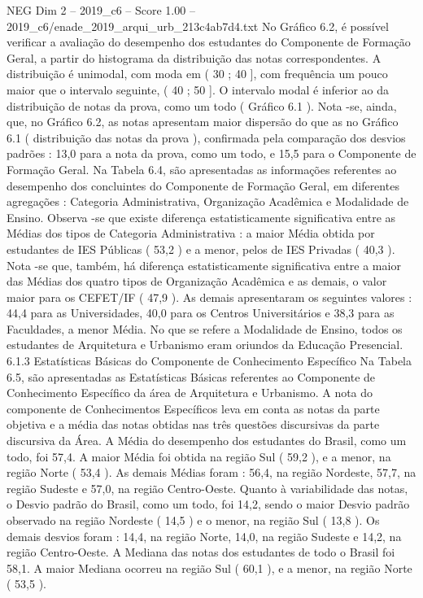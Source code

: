 \begin{textsample}{NEG Dim 2 – 2019\_c6 – Score 1.00 – 2019\_c6/enade\_2019\_arqui\_urb\_213c4ab7d4.txt}
No Gráfico 6.2, é possível verificar a avaliação do desempenho dos estudantes do Componente de Formação Geral, a partir do histograma da distribuição das notas correspondentes.
A distribuição é unimodal, com moda em ( 30 ; 40 ], com frequência um pouco maior que o intervalo seguinte, ( 40 ; 50 ].
O intervalo modal é inferior ao da distribuição de notas da prova, como um todo ( Gráfico 6.1 ).
Nota -se, ainda, que, no Gráfico 6.2, as notas apresentam maior dispersão do que as no Gráfico 6.1 ( distribuição das notas da prova ), confirmada pela comparação dos desvios padrões : 13,0 para a nota da prova, como um todo, e 15,5 para o Componente de Formação Geral.
Na Tabela 6.4, são apresentadas as informações referentes ao desempenho dos concluintes do Componente de Formação Geral, em diferentes agregações : Categoria Administrativa, Organização Acadêmica e Modalidade de Ensino.
Observa -se que existe diferença estatisticamente significativa entre as Médias dos tipos de Categoria Administrativa : a maior Média obtida por estudantes de IES Públicas ( 53,2 ) e a menor, pelos de IES Privadas ( 40,3 ).
Nota -se que, também, há diferença estatisticamente significativa entre a maior das Médias dos quatro tipos de Organização Acadêmica e as demais, o valor maior para os CEFET/IF ( 47,9 ).
As demais apresentaram os seguintes valores : 44,4 para as Universidades, 40,0 para os Centros Universitários e 38,3 para as Faculdades, a menor Média.
No que se refere a Modalidade de Ensino, todos os estudantes de Arquitetura e Urbanismo eram oriundos da Educação Presencial. 6.1.3 Estatísticas Básicas do Componente de Conhecimento Específico Na Tabela 6.5, são apresentadas as Estatísticas Básicas referentes ao Componente de Conhecimento Específico da área de Arquitetura e Urbanismo.
A nota do componente de Conhecimentos Específicos leva em conta as notas da parte objetiva e a média das notas obtidas nas três questões discursivas da parte discursiva da Área.
A Média do desempenho dos estudantes do Brasil, como um todo, foi 57,4.
A maior Média foi obtida na região Sul ( 59,2 ), e a menor, na região Norte ( 53,4 ).
As demais Médias foram : 56,4, na região Nordeste, 57,7, na região Sudeste e 57,0, na região Centro-Oeste.
Quanto à variabilidade das notas, o Desvio padrão do Brasil, como um todo, foi 14,2, sendo o maior Desvio padrão observado na região Nordeste ( 14,5 ) e o menor, na região Sul ( 13,8 ).
Os demais desvios foram : 14,4, na região Norte, 14,0, na região Sudeste e 14,2, na região Centro-Oeste.
A Mediana das notas dos estudantes de todo o Brasil foi 58,1.
A maior Mediana ocorreu na região Sul ( 60,1 ), e a menor, na região Norte ( 53,5 ).

\end{textsample}
